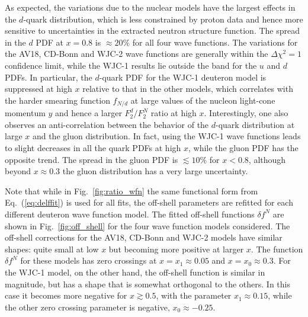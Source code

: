 \documentclass[aps,prd,amsmath,preprint]{revtex4}
\begin{document}
As expected, the variations due to the nuclear models have the
largest effects in the $d$-quark distribution, which is less
constrained by proton data and hence more sensitive to uncertainties
in the extracted neutron structure function.  The spread in the
$d$ PDF at $x=0.8$ is $\approx 20\%$ for all four wave functions.
The variations for the AV18, CD-Bonn and WJC-2 wave functions are
generally within the $\Delta\chi^2=1$ confidence limit, while the
WJC-1 results lie outside the band for the $u$ and $d$ PDFs.
In particular, the $d$-quark PDF for the WJC-1 deuteron model
is suppressed at high $x$ relative to that in the other models,
which correlates with the harder smearing function $f_{N/d}$
at large values of the nucleon light-cone momentum $y$ and
hence a larger $F_2^d/F_2^N$ ratio at high $x$.
%
Interestingly, one also observes an anti-correlation between the
behavior of the $d$-quark distribution at large $x$ and the gluon
distribution.  In fact, using the WJC-1 wave functions leads to
slight decreases in all the quark PDFs at high $x$, while the
gluon PDF has the opposite trend.  The spread in the gluon PDF
is $\lesssim 10\%$ for $x<0.8$, although beyond $x \approx 0.3$
the gluon distribution has a very large uncertainty.


Note that while in Fig.~\ref{fig:ratio_wfn} the same functional form
from Eq.~(\ref{eq:delffit}) is used for all fits, the off-shell
parameters are refitted for each different deuteron wave function
model.  The fitted off-shell functions $\delta f^N$ are shown in
Fig.~\ref{fig:off_shell} for the four wave function models considered.
The off-shell corrections for the AV18, CD-Bonn and WJC-2 models have
similar shapes: quite small at low $x$ but becoming more positive at
larger $x$.  The function $\delta f^N$ for these models has zero
crossings at $x = x_1 \approx 0.05$ and $x = x_0 \approx 0.3$.
For the WJC-1 model, on the other hand, the off-shell function is
similar in magnitude, but has a shape that is somewhat orthogonal
to the others.  In this case it becomes more negative for
$x \gtrsim 0.5$, with the parameter $x_1 \approx 0.15$, while the
other zero crossing parameter is negative, $x_0 \approx -0.25$.
\end{document}
